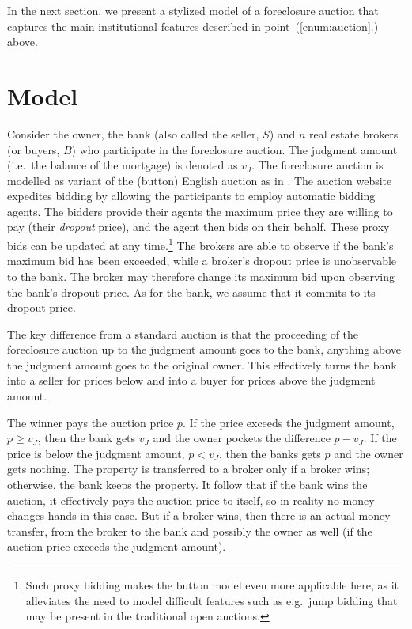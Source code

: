 \documentclass[11pt,twopage]{article}
\begin{document}
In the next section, we present a stylized model of a foreclosure auction that captures the main institutional features described in point~(\ref{enum:auction}.) above.


\section{Model}

Consider the owner, the bank (also called the seller, $S$) and $n$ real estate brokers
(or buyers, $B$) who participate in the foreclosure auction. The
judgment amount (i.e.\ the balance of the mortgage) is
denoted as $v_J$. The foreclosure auction is modelled as variant of the (button) English auction as in \cite{milgrom1982theory}. The auction website expedites bidding by allowing the participants to employ automatic bidding agents. The bidders provide their agents the maximum price they are willing to pay (their \emph{dropout} price), and the agent then bids on their behalf. These proxy bids can be updated at any time.\footnote{Such proxy bidding makes the button model even more applicable here, as it alleviates the need to model difficult features such as e.g.\ jump bidding that may be present in the traditional open auctions.} The brokers are able to observe if the bank's maximum bid has been exceeded, while a broker's dropout price is unobservable to the bank. The broker may therefore change its maximum bid upon observing the bank's dropout price. As for the bank, we assume that it commits to its dropout price.

The key difference from a standard auction is that the proceeding of the foreclosure auction up to the judgment amount goes to the bank, anything above the judgment amount goes to the original owner. This effectively turns the bank into a seller for prices below and into a buyer for prices above the judgment amount. 

The winner pays the auction price $p$.  If the price
exceeds the judgment amount, $p\geq v_J$, then the bank gets $v_J$ and
the owner pockets the difference $p - v_J$. If the price is below the
judgment amount, $p<v_J$, then the banks gets $p$ and the owner gets
nothing. The property is transferred to a broker only if a
broker wins; otherwise, the bank keeps the property. It follow that
if the bank wins the auction, it effectively pays the auction price to
itself, so in reality no money changes hands in this case. But if a
broker wins, then there is an actual money transfer, from the broker
to the bank and possibly the owner as well (if the auction price
exceeds the judgment amount).
\end{document}
